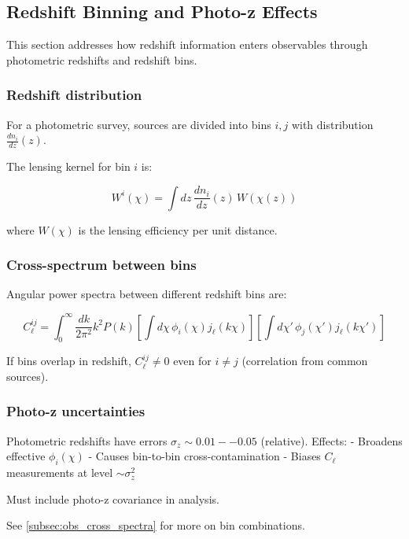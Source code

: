 \subsection{Redshift Binning and Photo-z Effects}\label{subsec:obs_redshift_binning}

This section addresses how redshift information enters observables through photometric redshifts and redshift bins.

\subsubsection{Redshift distribution}

For a photometric survey, sources are divided into bins $i, j$ with distribution $\frac{dn_i}{dz}(z)$.

The lensing kernel for bin $i$ is:

\begin{equation}
W^i(\chi) = \int dz \, \frac{dn_i}{dz}(z) \, W(\chi(z))
\end{equation}

where $W(\chi)$ is the lensing efficiency per unit distance.

\subsubsection{Cross-spectrum between bins}

Angular power spectra between different redshift bins are:

\begin{equation}
C_\ell^{ij} = \int_0^\infty \frac{dk}{2\pi^2} k^2 P(k) \left[\int d\chi \, \phi_i(\chi) j_\ell(k\chi)\right] \left[\int d\chi' \, \phi_j(\chi') j_\ell(k\chi')\right]
\end{equation}

If bins overlap in redshift, $C_\ell^{ij} \neq 0$ even for $i \neq j$ (correlation from common sources).

\subsubsection{Photo-z uncertainties}

Photometric redshifts have errors $\sigma_z \sim 0.01--0.05$ (relative). Effects:
- Broadens effective $\phi_i(\chi)$
- Causes bin-to-bin cross-contamination
- Biases $C_\ell$ measurements at level $\sim \sigma_z^2$

Must include photo-z covariance in analysis.

See \cref{subsec:obs_cross_spectra} for more on bin combinations.
